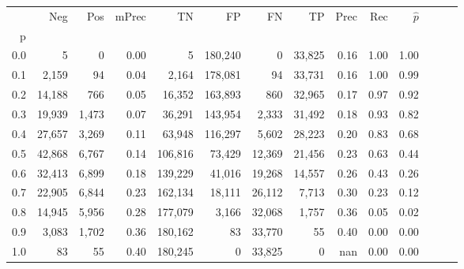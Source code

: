 \begin{tabular}{rrrrrrrrrrrrrr}
\toprule
{} &     Neg &    Pos & mPrec &       TN &       FP &      FN &      TP &  Prec &   Rec & $\hat{p}$ \\
p   &         &        &       &          &          &         &         &       &       &           \\
\midrule
0.0 &       5 &      0 &  0.00 &        5 &  180,240 &       0 &  33,825 &  0.16 &  1.00 &      1.00 \\
0.1 &   2,159 &     94 &  0.04 &    2,164 &  178,081 &      94 &  33,731 &  0.16 &  1.00 &      0.99 \\
0.2 &  14,188 &    766 &  0.05 &   16,352 &  163,893 &     860 &  32,965 &  0.17 &  0.97 &      0.92 \\
0.3 &  19,939 &  1,473 &  0.07 &   36,291 &  143,954 &   2,333 &  31,492 &  0.18 &  0.93 &      0.82 \\
0.4 &  27,657 &  3,269 &  0.11 &   63,948 &  116,297 &   5,602 &  28,223 &  0.20 &  0.83 &      0.68 \\
0.5 &  42,868 &  6,767 &  0.14 &  106,816 &   73,429 &  12,369 &  21,456 &  0.23 &  0.63 &      0.44 \\
0.6 &  32,413 &  6,899 &  0.18 &  139,229 &   41,016 &  19,268 &  14,557 &  0.26 &  0.43 &      0.26 \\
0.7 &  22,905 &  6,844 &  0.23 &  162,134 &   18,111 &  26,112 &   7,713 &  0.30 &  0.23 &      0.12 \\
0.8 &  14,945 &  5,956 &  0.28 &  177,079 &    3,166 &  32,068 &   1,757 &  0.36 &  0.05 &      0.02 \\
0.9 &   3,083 &  1,702 &  0.36 &  180,162 &       83 &  33,770 &      55 &  0.40 &  0.00 &      0.00 \\
1.0 &      83 &     55 &  0.40 &  180,245 &        0 &  33,825 &       0 &   nan &  0.00 &      0.00 \\
\bottomrule
\end{tabular}
